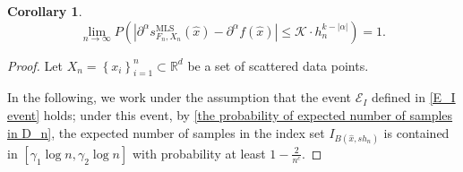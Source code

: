 \documentclass{article}
\newtheorem{coro}{Corollary}
\newcommand{\mlsfunstoch}{s^\text{MLS}_{F_n,X_n}}
\begin{document}
\begin{coro}
    \begin{equation}
    \lim_{n\rightarrow\infty}P\left(\left|\partial^{\alpha} \mlsfunstoch(\hat{x})-\partial^{\alpha} f(\hat{x})\right| \leq\mathcal{K}\cdot h_n^{k-|\alpha|}\right)=1.
    \end{equation}  
\end{coro}

\begin{proof}

Let $X_n=\left\{x_i\right\}_{i=1}^n\subset\mathbb{R}^d$ be a set of scattered data points.

In the following, we work under the assumption that the event $\mathscr{E}_I$ defined in \eqref{E_I event} holds;  under this event, by \eqref{the probability of expected number of samples in D_n}, the expected number of samples in the index set
\( I_{B(\hat{x}, s h_n)} \) is contained in $[\gamma_1 \log n,\gamma_2 \log n]$ with probability at least \( 1 - \frac{2}{n^c} \). 


\end{proof}
\end{document}
